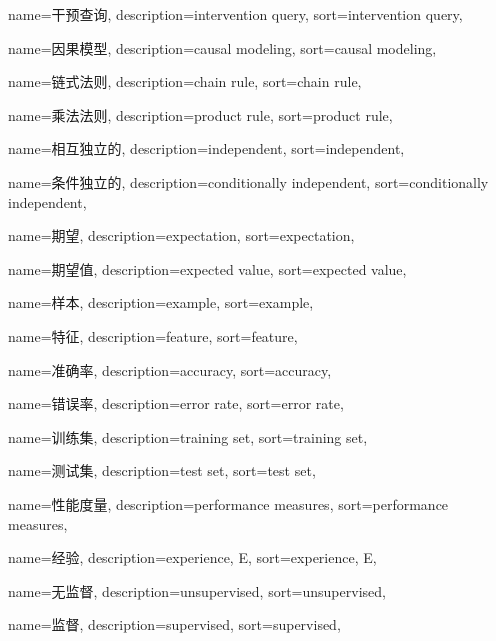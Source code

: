 {
  name=干预查询,
  description={intervention query},
  sort={intervention query},
}

{
  name=因果模型,
  description={causal modeling},
  sort={causal modeling},
}

{
  name=链式法则,
  description={chain rule},
  sort={chain rule},
}

{
  name=乘法法则,
  description={product rule},
  sort={product rule},
}

{
  name=相互独立的,
  description={independent},
  sort={independent},
}

{
  name=条件独立的,
  description={conditionally independent},
  sort={conditionally independent},
}

{
  name=期望,
  description={expectation},
  sort={expectation},
}

{
  name=期望值,
  description={expected value},
  sort={expected value},
}

{
  name=样本,
  description={example},
  sort={example},
}

{
  name=特征,
  description={feature},
  sort={feature},
}

{
  name=准确率,
  description={accuracy},
  sort={accuracy},
}

{
  name=错误率,
  description={error rate},
  sort={error rate},
}

{
  name=训练集,
  description={training set},
  sort={training set},
}

{
  name=测试集,
  description={test set},
  sort={test set},
}

{
  name=性能度量,
  description={performance measures},
  sort={performance measures},
}

{
  name=经验,
  description={experience, E},
  sort={experience, E},
}

{
  name=无监督,
  description={unsupervised},
  sort={unsupervised},
}

{
  name=监督,
  description={supervised},
  sort={supervised},
}

